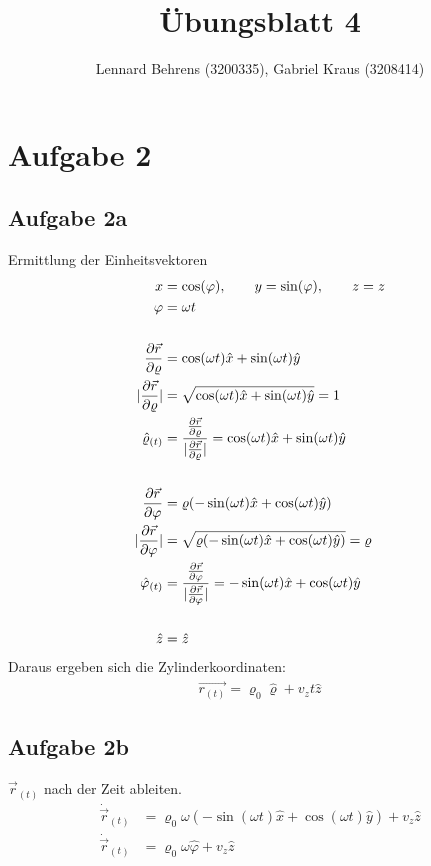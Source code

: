 \documentclass[a4paper,10pt]{extarticle}
\title{Übungsblatt 4}
\author{Lennard Behrens (3200335), Gabriel Kraus (3208414)}
\begin{document}
\maketitle

\section*{Aufgabe 2}
\subsection*{Aufgabe 2a}
Ermittlung der Einheitsvektoren
\begin{align*}
x &= \cos(\varphi), \qquad y = \sin(\varphi), \qquad z = z \\
\varphi &= \omega t \\ \\
\pdv{\vec{r}}{\varrho} &= \cos(\omega t ) \hat{x} + \sin(\omega t ) \hat{y} \\ 
| \pdv{\vec{r}}{\varrho} | &= \sqrt{\cos(\omega t ) \hat{x} + \sin(\omega t ) \hat{y}} = 1 \\ 
\hat{\varrho}_{(t)} &= \frac{\pdv{\vec{r}}{\varrho}}{ | \pdv{\vec{r}}{\varrho} | } = \cos(\omega t ) \hat{x} + \sin(\omega t ) \hat{y} \\ \\
\pdv{\vec{r}}{\varphi} &= \varrho (-\sin(\omega t ) \hat{x} + \cos(\omega t ) \hat{y}) \\ 
| \pdv{\vec{r}}{\varphi} | &= \sqrt{\varrho (-\sin(\omega t ) \hat{x} + \cos(\omega t ) \hat{y})} = \varrho \\ 
\hat{\varphi}_{(t)} &= \frac{\pdv{\vec{r}}{\varphi}}{ | \pdv{\vec{r}}{\varphi} | } = -\sin(\omega t ) \hat{x} + \cos(\omega t ) \hat{y} \\ \\
\hat{z} &= \hat{z}
\end{align*}
Daraus ergeben sich die Zylinderkoordinaten: 
\begin{align*}
\vec{r_{(t)}} = \varrho_0 \hat{\varrho} + v_z t \hat{z}
\end{align*}

\subsection*{Aufgabe 2b}
$\vec{r}_{(t)}$ nach der Zeit ableiten.
\begin{align*}
\dot{\vec{r}}_{(t)} &= \varrho_0 \omega (-\sin(\omega t )\hat{x} + \cos(\omega t ) \hat{y}) + v_z \hat{z} \\
\dot{\vec{r}}_{(t)} &= \varrho_0 \omega \hat{\varphi} + v_z \hat{z} \\
\end{align*}
\end{document}
